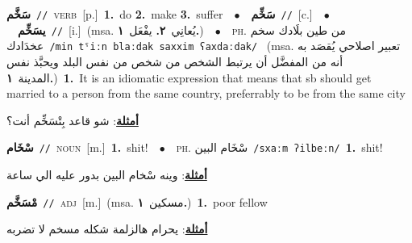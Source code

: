 \documentclass[10pt,a4paper,twoside]{article} %
\begin{document}
\begin{multicols}{2}
{\setlength\topsep{0pt}\textbf{\foreignlanguage{arabic}{سَخَّم}}\ {\color{gray}\texttt{//}\color{black}}\ \textsc{verb}\ [p.]\ \textbf{1.}~do  \textbf{2.}~make  \textbf{3.}~suffer\ \ $\bullet$\ \ \setlength\topsep{0pt}\textbf{\foreignlanguage{arabic}{سَخِّم}}\ {\color{gray}\texttt{//}\color{black}}\ [c.]\ \ $\bullet$\ \ \setlength\topsep{0pt}\textbf{\foreignlanguage{arabic}{يسَخِّم}}\ {\color{gray}\texttt{//}\color{black}}\ [i.]\ \color{gray}(msa. \foreignlanguage{arabic}{يُعانِي}~\foreignlanguage{arabic}{\textbf{٢.}}  \foreignlanguage{arabic}{يفْعَل}~\foreignlanguage{arabic}{\textbf{١.}})\color{black}\ \ $\bullet$\ \ \textsc{ph.} \color{gray} \foreignlanguage{arabic}{من طين بلَادك سخم عخدَادك}\color{black}\ {\color{gray}\texttt{/{\sffamily min tˤiːn blaːdak saxxim ʕaxdaːdak}/}\color{black}}\ \color{gray} (msa. \foreignlanguage{arabic}{تعبير اصلاحي يُقصَد به أنه من المفضَّل أن يرتبط الشخص من شخص من نفس البلد ويحبَّذ نفس المدينة}~\foreignlanguage{arabic}{\textbf{١.}})\color{black}\ \textbf{1.}~It is an idiomatic expression that means  that sb should get married to a person from the same country, preferrably to be from the same city\  \begin{flushright}\color{gray}\foreignlanguage{arabic}{\textbf{\underline{\foreignlanguage{arabic}{أمثلة}}}: شو قاعد بِتْسَخِّم أنت؟}\end{flushright}\color{black}} \vspace{2mm}

{\setlength\topsep{0pt}\textbf{\foreignlanguage{arabic}{سْخَام}}\ {\color{gray}\texttt{//}\color{black}}\ \textsc{noun}\ [m.]\ \textbf{1.}~shit!\ \ $\bullet$\ \ \textsc{ph.} \color{gray} \foreignlanguage{arabic}{سْخَام البين}\color{black}\ {\color{gray}\texttt{/{\sffamily sxaːm ʔilbeːn}/}\color{black}}\ \textbf{1.}~shit!\  \begin{flushright}\color{gray}\foreignlanguage{arabic}{\textbf{\underline{\foreignlanguage{arabic}{أمثلة}}}: وينه سْخام البين بدور عليه الي ساعة}\end{flushright}\color{black}} \vspace{2mm}

{\setlength\topsep{0pt}\textbf{\foreignlanguage{arabic}{مْسَخَّم}}\ {\color{gray}\texttt{//}\color{black}}\ \textsc{adj}\ [m.]\ \color{gray}(msa. \foreignlanguage{arabic}{مسكين}~\foreignlanguage{arabic}{\textbf{١.}})\color{black}\ \textbf{1.}~poor fellow\  \begin{flushright}\color{gray}\foreignlanguage{arabic}{\textbf{\underline{\foreignlanguage{arabic}{أمثلة}}}: يحرام هالزلمة شكله مسخم لا تضربه}\end{flushright}\color{black}} \vspace{2mm}


\end{multicols}
\end{document}
